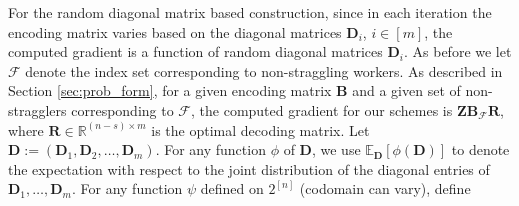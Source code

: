 \documentclass[journal,draftcls,onecolumn]{IEEEtran}
\theoremstyle{mystyle}
\newcommand{\bfD}{\mathbf{D}}
\newcommand{\bfR}{\mathbf{R}}
\newcommand{\cF}{\mathcal{F}}
\begin{document}
For the random diagonal matrix based construction, since in each iteration the encoding matrix varies based on the diagonal matrices $\mathbf{D}_i$, $i \in [m]$, the computed gradient is a function of random diagonal matrices $\mathbf{D}_i$. As before we let $\mathcal{F}$ denote the index set corresponding to non-straggling workers. 
%
As described in Section \ref{sec:prob_form}, for a given encoding matrix $\mathbf{B}$ and a given set of non-stragglers corresponding to $\mathcal{F}$, the computed gradient for our schemes is $\mathbf{Z} \mathbf{B}_{\cF}\mathbf{R}$, where $\bfR \in \mathbb{R}^{(n-s) \times m}$ is the optimal decoding matrix. Let $\mathbf{D} := (\mathbf{D}_1, \mathbf{D}_2, \dots, \mathbf{D}_m)$. %
For any function $\phi$ of $\mathbf{D}$, we use $\mathbb{E}_{\mathbf{D}}[\phi(\mathbf{D})]$ to denote the expectation with respect to the joint distribution of the diagonal entries of $\mathbf{D}_1,\ldots,\mathbf{D}_m$. For any function $\psi$ defined on $2^{[n]}$ (codomain can vary), define 

\end{document}
